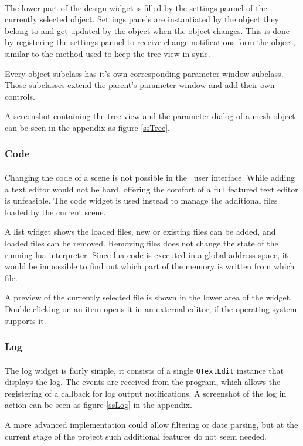 \paragraph{}
The lower part of the design widget is filled by the settings pannel of the currently selected object.
Settings panels are instantiated by the object they belong to and get updated by the object when the object changes.
This is done by registering the settings pannel to receive change notifications form the object, similar to the method used to keep the tree view in sync.

Every object subclass has it's own corresponding parameter window subclass.
Those subclasses extend the parent's parameter window and add their own controls.

A screenshot containing the tree view and the parameter dialog of a mesh object can be seen in the appendix as figure \ref{ssTree}.


\subsubsection{Code}
\paragraph{}
Changing the code of a scene is not possible in the \ER\ user interface.
While adding a text editor would not be hard, offering the comfort of a full featured text editor is unfeasible.
The code widget is used instead to manage the additional files loaded by the current scene.

A list widget shows the loaded files, new or existing files can be added, and loaded files can be removed.
Removing files does not change the state of the running lua interpreter.
Since lua code is executed in a global address space, it would be impossible to find out which part of the memory is written from which file.

A preview of the currently selected file is shown in the lower area of the widget.
Double clicking on an item opens it in an external editor, if the operating system supports it.


\subsubsection{Log}
\paragraph{}
The log widget is fairly simple, it consists of a single \lstinline{QTextEdit} instance that displays the log.
The events are received from the program, which allows the registering of a callback for log output notifications.
A screenshot of the log in action can be seen as figure \ref{ssLog} in the appendix.

A more advanced implementation could allow filtering or date parsing, but at the current stage of the project such additional features do not seem needed.

